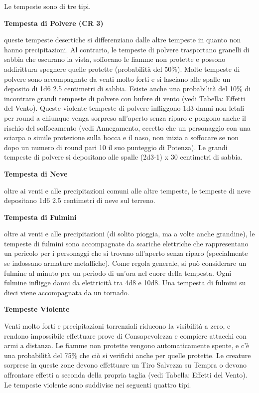 \documentclass[a4paper,11pt,twoside,openany]{book}
\begin{document}
{Le tempeste sono di tre tipi.

\textbf{Tempesta di Polvere (CR 3)}

queste tempeste desertiche si differenziano dalle altre tempeste in quanto non hanno precipitazioni. Al contrario, le tempeste di polvere trasportano granelli di sabbia che oscurano la vista, soffocano le fiamme non protette e possono addirittura spegnere quelle protette (probabilità del 50\%). Molte tempeste di polvere sono accompagnate da venti molto forti e si lasciano alle spalle un deposito di 1d6 \texttimes{} 2.5 centimetri di sabbia.
Esiste anche una probabilità del 10\% di incontrare grandi tempeste di polvere con bufere di vento (vedi Tabella: Effetti del Vento). Queste violente tempeste di polvere infliggono 1d3 danni non letali per round a chiunque venga sorpreso all'aperto senza riparo e pongono anche il rischio del soffocamento (vedi Annegamento, eccetto che un personaggio con una sciarpa o simile protezione sulla bocca e il naso, non inizia a soffocare se non dopo un numero di round pari 10 \texttimes{} il suo punteggio di Potenza). Le grandi tempeste di polvere si depositano alle spalle (2d3-1) x 30 centimetri di sabbia.

\textbf{Tempesta di Neve}

oltre ai venti e alle precipitazioni comuni alle altre tempeste, le tempeste di neve depositano 1d6 \texttimes{} 2.5 centimetri di neve sul terreno.

\textbf{Tempesta di Fulmini}

oltre ai venti e alle precipitazioni (di solito pioggia, ma a volte anche grandine), le tempeste di fulmini sono accompagnate da scariche elettriche che rappresentano un pericolo per i personaggi che si trovano all'aperto senza riparo (specialmente se indossano armature metalliche). Come regola generale, si può considerare un fulmine al minuto per un periodo di un'ora nel cuore della tempesta. Ogni fulmine infligge danni da elettricità tra 4d8 e 10d8. Una tempesta di fulmini su dieci viene accompagnata da un tornado.

\textbf{Tempeste Violente}

Venti molto forti e precipitazioni torrenziali riducono la visibilità a zero, e rendono impossibile effettuare prove di Consapevolezza e compiere attacchi con armi a distanza. Le fiamme non protette vengono automaticamente spente, e c'è una probabilità del 75\% che ciò si verifichi anche per quelle protette. Le creature sorprese in queste zone devono effettuare un Tiro Salvezza su Tempra o devono affrontare effetti a seconda della propria taglia (vedi Tabella: Effetti del Vento). Le tempeste violente sono suddivise nei seguenti quattro tipi.

}
\end{document}
